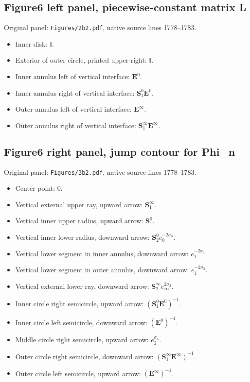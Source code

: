 \documentclass[11pt]{article}
\numberwithin{equation}{section}
\numberwithin{equation}{section}
\begin{document}
\subsection*{Figure6 left panel, piecewise-constant matrix L}
\noindent Original panel: \texttt{Figures/2b2.pdf}, native source lines 1778--1783.
\begin{itemize}\itemsep=0pt
\item Inner disk: $\mathbb{I}$.
\item Exterior of outer circle, printed upper-right: $\mathbb{I}$.
\item Inner annulus left of vertical interface: $\mathbf{E}^0{}$.
\item Inner annulus right of vertical interface: $\mathbf{S}_1^0{}\mathbf{E}^0{}$.
\item Outer annulus left of vertical interface: $\mathbf{E}^\infty{}$.
\item Outer annulus right of vertical interface: $\mathbf{S}_1^\infty{}\mathbf{E}^\infty{}$.
\end{itemize}

\subsection*{Figure6 right panel, jump contour for Phi\_n}
\noindent Original panel: \texttt{Figures/3b2.pdf}, native source lines 1778--1783.
\begin{itemize}\itemsep=0pt
\item Center point: $0$.
\item Vertical external upper ray, upward arrow: $\mathbf{S}_1^\infty{}$.
\item Vertical inner upper radius, upward arrow: $\mathbf{S}_1^0{}$.
\item Vertical inner lower radius, downward arrow: $\mathbf{S}_2^0{}e_0^{-2\sigma_3}$.
\item Vertical lower segment in inner annulus, downward arrow: $e_1^{-2\sigma_3}$.
\item Vertical lower segment in outer annulus, downward arrow: $e_1^{-2\sigma_3}$.
\item Vertical external lower ray, downward arrow: $\mathbf{S}_2^\infty{}e_\infty^{2\sigma_3}$.
\item Inner circle right semicircle, upward arrow: $(\mathbf{S}_1^0{}\mathbf{E}^0{})^{-1}$.
\item Inner circle left semicircle, downward arrow: $(\mathbf{E}^0{})^{-1}$.
\item Middle circle right semicircle, upward arrow: $e_2^{\sigma_3}$.
\item Outer circle right semicircle, downward arrow: $(\mathbf{S}_1^\infty{}\mathbf{E}^\infty{})^{-1}$.
\item Outer circle left semicircle, upward arrow: $(\mathbf{E}^\infty{})^{-1}$.
\end{itemize}
\end{document}
